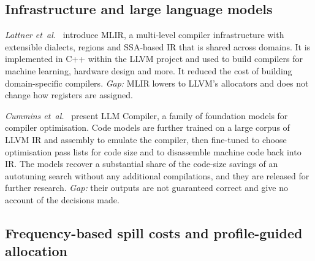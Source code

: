 \documentclass{ieeeaccess}
\begin{document}
\subsection{Infrastructure and large language models}

\textit{Lattner et~al.}~\cite{lattner2021mlir} introduce MLIR, a
multi-level compiler infrastructure with extensible dialects, regions
and SSA-based IR that is shared across domains. It is implemented in
C++ within the LLVM project and used to build compilers for machine
learning, hardware design and more. It reduced the cost of building
domain-specific compilers. \textit{Gap:} MLIR lowers to LLVM's
allocators and does not change how registers are assigned.

\textit{Cummins et~al.}~\cite{cummins2025llmcompiler} present LLM
Compiler, a family of foundation models for compiler optimisation. Code
models are further trained on a large corpus of LLVM IR and assembly to
emulate the compiler, then fine-tuned to choose optimisation pass
lists for code size and to disassemble machine code back into IR. The
models recover a substantial share of the code-size savings of an
autotuning search without any additional compilations, and they are
released for further research. \textit{Gap:} their outputs are not
guaranteed correct and give no account of the decisions made.

\subsection{Frequency-based spill costs and profile-guided allocation}
\label{sec:freqrw}
\end{document}
